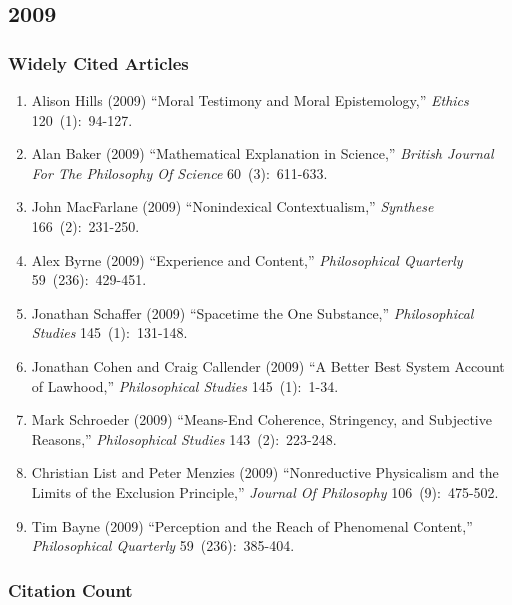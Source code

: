 \documentclass[
  10pt,
  letterpaper,
  DIV=11,
  numbers=noendperiod,
  twoside]{scrartcl}
\providecommand{\tightlist}{%
  \setlength{\itemsep}{0pt}\setlength{\parskip}{0pt}}\usepackage{longtable,booktabs,array}
\begin{document}
\newpage

\subsection{2009}\label{sec-s2009}

\subsubsection*{Widely Cited Articles}\label{widely-cited-articles-53}

\begin{enumerate}
\def\labelenumi{\arabic{enumi}.}
\tightlist
\item
  Alison Hills (2009) ``Moral Testimony and Moral Epistemology,''
  \emph{Ethics} 120~(1):~94-127.
\item
  Alan Baker (2009) ``Mathematical Explanation in Science,''
  \emph{British Journal For The Philosophy Of Science} 60~(3):~611-633.
\item
  John MacFarlane (2009) ``Nonindexical Contextualism,'' \emph{Synthese}
  166~(2):~231-250.
\item
  Alex Byrne (2009) ``Experience and Content,'' \emph{Philosophical
  Quarterly} 59~(236):~429-451.
\item
  Jonathan Schaffer (2009) ``Spacetime the One Substance,''
  \emph{Philosophical Studies} 145~(1):~131-148.
\item
  Jonathan Cohen and Craig Callender (2009) ``A Better Best System
  Account of Lawhood,'' \emph{Philosophical Studies} 145~(1):~1-34.
\item
  Mark Schroeder (2009) ``Means-End Coherence, Stringency, and
  Subjective Reasons,'' \emph{Philosophical Studies} 143~(2):~223-248.
\item
  Christian List and Peter Menzies (2009) ``Nonreductive Physicalism and
  the Limits of the Exclusion Principle,'' \emph{Journal Of Philosophy}
  106~(9):~475-502.
\item
  Tim Bayne (2009) ``Perception and the Reach of Phenomenal Content,''
  \emph{Philosophical Quarterly} 59~(236):~385-404.
\end{enumerate}

\subsubsection*{Citation Count}\label{sec-count-2009}
\end{document}
